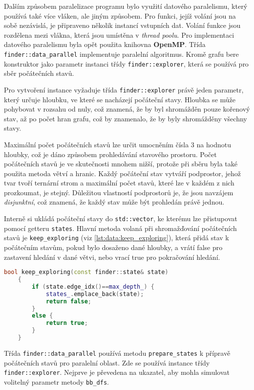 Dalším způsobem paralelizace programu bylo využití datového paralelismu, který používá také více vláken, ale jiným způsobem.
Pro funkci, jejíž volání jsou na sobě nezávislá, je připraveno několik instancí vstupních dat.
Volání funkce jsou rozdělena mezi vlákna, která jsou umístěna v \textit{thread poolu}.
Pro implementaci datového paralelismu byla opět použita knihovna \textbf{OpenMP}.
Třída \texttt{finder::data\_parallel} implementuje paralelní algoritmus.
Kromě grafu bere konstruktor jako parametr instanci třídy \texttt{finder::explorer}, která se používá pro sběr počátečních stavů. 

Pro vytvoření instance vyžaduje třída \texttt{finder::explorer}  právě jeden parametr, který určuje hloubku, ve které se nacházejí počáteční stavy.
Hloubka se může pohybovat v rozsahu od nuly, což znamená, že by byl shromážděn pouze kořenový stav, až po počet hran grafu, což by znamenalo, že by byly shromážděny všechny stavy.

Maximální počet počátečních stavů lze určit umocněním čísla 3 na hodnotu hloubky, což je dáno způsobem prohledávání stavového prostoru.
Počet počátečních stavů je ve skutečnosti mnohem nižší, protože při sběru byla také použita metoda větví a hranic.
Každý počáteční stav vytváří podprostor, jehož tvar tvoří ternární strom a maximální počet stavů, které lze v každém z nich prozkoumat, je stejný.
Důležitou vlastností podprostorů je, že jsou navzájem \textit{disjunktní}, což znamená, že každý stav může být prohledán právě jednou.

Interně si ukládá počáteční stavy do \texttt{std::vector}, ke kterému lze přistupovat pomocí getteru \texttt{states}.
Hlavní metoda volaná při shromažďování počátečních stavů je \texttt{keep\_exploring} (viz \ref{lst:data:keep_exploring}), která přidá stav k počátečním stavům, pokud bylo dosaženo dané hloubky, a vrátí false pro zastavení hledání v dané větvi, nebo vrací true pro pokračování hledání.

\begin{lstlisting}[language=C++, label={lst:data:keep_exploring}, title={Metoda pro řízení prohledávání}]
    bool keep_exploring(const finder::state& state)
    {
        if (state.edge_idx()==max_depth_) {
            states_.emplace_back(state);
            return false;
        }
        else {
            return true;
        }
    }
\end{lstlisting}

Třída \texttt{finder::data\_parallel} používá metodu \texttt{prepare\_states} k přípravě počátečních stavů pro paralelní oblast.
Zde se používá instance třídy \texttt{finder::explorer}.
Nejprve je převedena na ukazatel, aby mohla simulovat volitelný parametr metody \texttt{bb\_dfs}.


